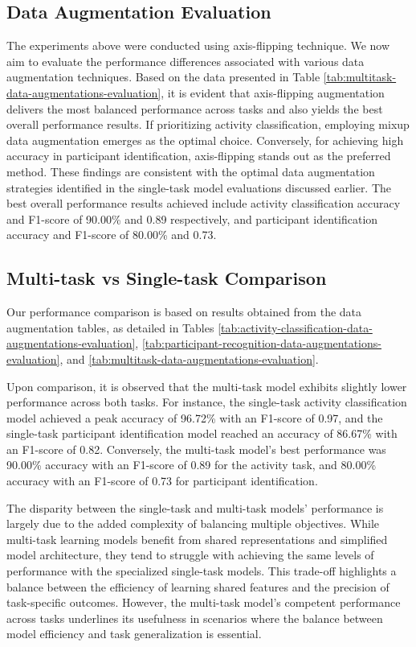 \documentclass{l4proj}
\begin{document}
\subsection{Data Augmentation Evaluation}
The experiments above were conducted using axis-flipping technique. We now aim to evaluate the performance differences associated with various data augmentation techniques. Based on the data presented in Table \ref{tab:multitask-data-augmentations-evaluation}, it is evident that axis-flipping augmentation delivers the most balanced performance across tasks and also yields the best overall performance results. If prioritizing activity classification, employing mixup data augmentation emerges as the optimal choice. Conversely, for achieving high accuracy in participant identification, axis-flipping stands out as the preferred method. These findings are consistent with the optimal data augmentation strategies identified in the single-task model evaluations discussed earlier. The best overall performance results achieved include activity classification accuracy and F1-score of 90.00\% and 0.89 respectively, and participant identification accuracy and F1-score of 80.00\% and 0.73.

\subsection{Multi-task vs Single-task Comparison}
Our performance comparison is based on results obtained from the data augmentation tables, as detailed in Tables \ref{tab:activity-classification-data-augmentations-evaluation}, \ref{tab:participant-recognition-data-augmentations-evaluation}, and \ref{tab:multitask-data-augmentations-evaluation}.

Upon comparison, it is observed that the multi-task model exhibits slightly lower performance across both tasks. For instance, the single-task activity classification model achieved a peak accuracy of 96.72\% with an F1-score of 0.97, and the single-task participant identification model reached an accuracy of 86.67\% with an F1-score of 0.82. Conversely, the multi-task model's best performance was 90.00\% accuracy with an F1-score of 0.89 for the activity task, and 80.00\% accuracy with an F1-score of 0.73 for participant identification.

The disparity between the single-task and multi-task models' performance is largely due to the added complexity of balancing multiple objectives. While multi-task learning models benefit from shared representations and simplified model architecture, they tend to struggle with achieving the same levels of performance with the specialized single-task models. This trade-off highlights a balance between the efficiency of learning shared features and the precision of task-specific outcomes. However, the multi-task model's competent performance across tasks underlines its usefulness in scenarios where the balance between model efficiency and task generalization is essential.
\end{document}
